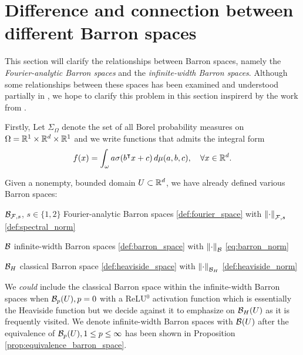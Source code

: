 \section{Difference and connection between different Barron spaces}
\label{sec:diff_barron_spaces}

This section will clarify the relationships between  Barron spaces, namely the
\textit{Fourier-analytic Barron spaces} and the \textit{infinite-width Barron
spaces}. Although some relationships between these spaces has been examined and
understood partially in
\cite{eBarronSpaceFlowinduced2021,eMathematicalUnderstandingNeural2020}, we hope
to clarify this problem in this section inspirerd by the work from
\cite{carageaNeuralNetworkApproximation2022}.

Firstly, Let $\Sigma_{\Omega}$ denote the set of all Borel probability
measures on $\Omega = \mathbb{R}^1 \times \mathbb{R}^d \times \mathbb{R}^1$ and we write functions that
admits the integral form
\begin{equation}
    \label{eq:integral_represent}
    f(x) = \int_{\omega} a\sigma(b{}^{\intercal} x + c) \,d\mu(a,b,c), \quad
    \forall x \in \mathbb{R}^d.
\end{equation}

Given a nonempty, bounded domain $U \subset \mathbb{R}^d$, we have already defined
various Barron spaces:

\begin{itemize}
    \item $\mathcal{B}_{\mathcal{F}, s}$, $s \in \{1,2\}$ Fourier-analytic Barron spaces 
        \eqref{def:fourier_space} with $\left\| \cdot \right\|_{\mathcal{F},s}$ 
        \eqref{def:spectral_norm}
    \item $\mathcal{B}$ infinite-width Barron spaces \eqref{def:barron_space} with
        $\left\| \cdot \right\|_{\mathcal{B}}$ \eqref{eq:barron_norm}
    {
        \setlength\itemindent{25pt}
        \item $\mathcal{B}_{H}$ classical Barron space \eqref{def:heaviside_space}
            with $\left\| \cdot \right\|_{\mathcal{B}_H}$ \eqref{def:heaviside_norm}
    }
\end{itemize}

We \textit{could} include the classical Barron space within the infinite-width
Barron spaces when $\mathcal{B}_{p}(U), p=0$ with a ReLU$^0$ activation function
which is essentially the Heaviside function but we decide against it to
emphasize on $\mathcal{B}_{H}(U)$ as it is frequently visited. We denote
infinite-width Barron spaces with $\mathcal{B}_{}(U)$ after the equivalence of
$\mathcal{B}_{p}(U), 1\leq p \leq\infty$ has been shown in Proposition
\ref{prop:equivalence_barron_space}.

